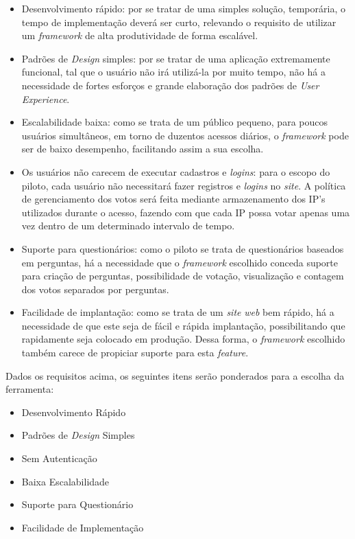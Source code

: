 \begin{itemize}
    \item Desenvolvimento rápido: por se tratar de uma simples solução, temporária, o tempo de implementação deverá
        ser curto, relevando o requisito de utilizar um \textit{framework} de alta produtividade de forma escalável.
    \item Padrões de \textit{Design} simples: por se tratar de uma aplicação extremamente funcional, tal que o usuário não irá
        utilizá-la por muito tempo, não há a necessidade de fortes esforços e grande elaboração dos padrões de
        \textit{User} \textit{Experience}.
    \item Escalabilidade baixa: como se trata de um público pequeno, para poucos usuários simultâneos, em torno de duzentos
        acessos diários, o \textit{framework} pode ser de baixo desempenho, facilitando assim a sua escolha.
    \item Os usuários não carecem de executar cadastros e \textit{logins}: para o escopo do piloto, cada usuário não necessitará
        fazer registros e \textit{logins} no \textit{site}. A política de gerenciamento dos votos será feita mediante armazenamento dos
        IP's utilizados durante o acesso, fazendo com que cada IP possa votar apenas uma vez dentro de um determinado
        intervalo de tempo.
    \item Suporte para questionários: como o piloto se trata de questionários baseados em perguntas, há a necessidade que o \textit{framework}
        escolhido conceda suporte para criação de perguntas, possibilidade de votação, visualização e contagem dos votos
        separados por perguntas.
    \item Facilidade de implantação: como se trata de um \textit{site} \textit{web} bem rápido, há a necessidade de que este seja de fácil e rápida
        implantação, possibilitando que rapidamente seja colocado em produção. Dessa forma, o \textit{framework} escolhido também carece
        de propiciar suporte para esta \textit{feature}.
\end{itemize}

Dados os requisitos acima, os seguintes itens serão ponderados para a escolha da ferramenta:
\begin{itemize}
    \item Desenvolvimento Rápido
    \item Padrões de \textit{Design} Simples
    \item Sem Autenticação
    \item Baixa Escalabilidade
    \item Suporte para Questionário
    \item Facilidade de Implementação
\end{itemize}

